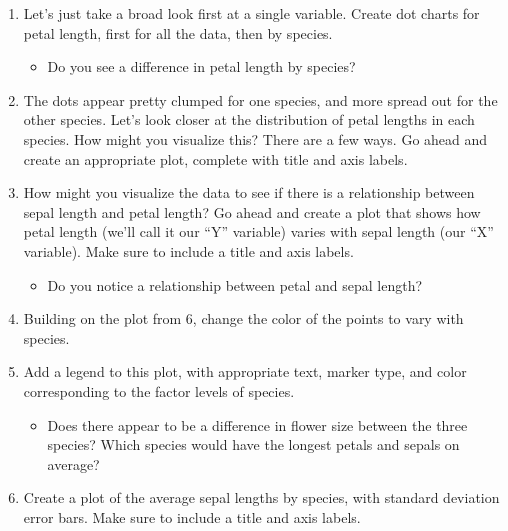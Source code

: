 \documentclass[]{article}
\providecommand{\tightlist}{%
  \setlength{\itemsep}{0pt}\setlength{\parskip}{0pt}}
\begin{document}
\begin{enumerate}
\def\labelenumi{\arabic{enumi}.}
\setcounter{enumi}{3}
\item
  Let's just take a broad look first at a single variable. Create dot
  charts for petal length, first for all the data, then by species.

  \begin{itemize}
  \tightlist
  \item
    Do you see a difference in petal length by species?
  \end{itemize}
\item
  The dots appear pretty clumped for one species, and more spread out
  for the other species. Let's look closer at the distribution of petal
  lengths in each species. How might you visualize this? There are a few
  ways. Go ahead and create an appropriate plot, complete with title and
  axis labels.
\item
  How might you visualize the data to see if there is a relationship
  between sepal length and petal length? Go ahead and create a plot that
  shows how petal length (we'll call it our ``Y'' variable) varies with
  sepal length (our ``X'' variable). Make sure to include a title and
  axis labels.

  \begin{itemize}
  \tightlist
  \item
    Do you notice a relationship between petal and sepal length?
  \end{itemize}
\item
  Building on the plot from 6, change the color of the points to vary
  with species.
\item
  Add a legend to this plot, with appropriate text, marker type, and
  color corresponding to the factor levels of species.

  \begin{itemize}
  \tightlist
  \item
    Does there appear to be a difference in flower size between the
    three species? Which species would have the longest petals and
    sepals on average?
  \end{itemize}
\item
  Create a plot of the average sepal lengths by species, with standard
  deviation error bars. Make sure to include a title and axis labels.
\end{enumerate}
\end{document}
